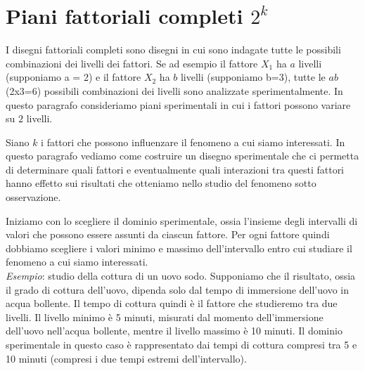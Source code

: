 \documentclass[
  11pt,
]{book}
\begin{document}
\hypertarget{piani-fattoriali-completi-2k}{%
\section{\texorpdfstring{Piani fattoriali completi \(2^k\)}{Piani fattoriali completi 2\^{}k}}\label{piani-fattoriali-completi-2k}}

I disegni fattoriali completi sono disegni in cui sono indagate tutte le
possibili combinazioni dei livelli dei fattori. Se ad esempio il fattore
\(X_1\) ha \(a\) livelli (supponiamo a = 2) e il fattore \(X_2\) ha \(b\)
livelli (supponiamo b=3), tutte le \(ab\) (2x3=6) possibili combinazioni
dei livelli sono analizzate sperimentalmente. In questo paragrafo
consideriamo piani sperimentali in cui i fattori possono variare su \(2\)
livelli.

Siano \(k\) i fattori che possono influenzare il fenomeno a cui siamo
interessati. In questo paragrafo vediamo come costruire un disegno
sperimentale che ci permetta di determinare quali fattori e
eventualmente quali interazioni tra questi fattori hanno effetto sui
risultati che otteniamo nello studio del fenomeno sotto osservazione.

Iniziamo con lo scegliere il dominio sperimentale, ossia l'insieme degli
intervalli di valori che possono essere assunti da ciascun fattore. Per
ogni fattore quindi dobbiamo scegliere i valori minimo e massimo
dell'intervallo entro cui studiare il fenomeno a cui siamo interessati.\\
\emph{Esempio}: studio della cottura di un uovo sodo. Supponiamo che il
risultato, ossia il grado di cottura dell'uovo, dipenda solo dal tempo
di immersione dell'uovo in acqua bollente. Il tempo di cottura quindi è
il fattore che studieremo tra due livelli. Il livello minimo è 5 minuti,
misurati dal momento dell'immersione dell'uovo nell'acqua bollente,
mentre il livello massimo è 10 minuti. Il dominio sperimentale in questo
caso è rappresentato dai tempi di cottura compresi tra 5 e 10 minuti
(compresi i due tempi estremi dell'intervallo).
\end{document}
